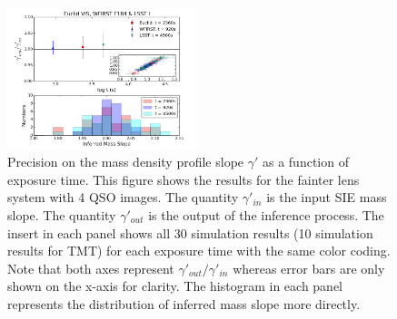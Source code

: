 \documentclass[a4paper,11pt]{article}
\begin{document}
\begin{figure}
\begin{center}
\includegraphics[width=0.49\textwidth]{figures/gamma_hist_135949_4QSO_EWL.png}
\end{center}
\caption{Precision on the mass density profile slope $\gamma'$ as a function of exposure time.  This figure shows the results for the fainter lens system with 4 QSO images. The quantity $\gamma'_{in}$ is the input SIE mass slope. The quantity $\gamma'_{out}$ is the output of the inference process.
The insert in each panel shows all 30 simulation results (10 simulation results for TMT) for each exposure time with the same color coding. Note that both axes represent $\gamma'_{out}/\gamma'_{in}$ whereas error bars are only shown on the x-axis for clarity.
The histogram in each panel represents the distribution of inferred mass slope more directly.}
\label{fig:gamma_fainter_4QSOimages}
\end{figure}
\end{document}
